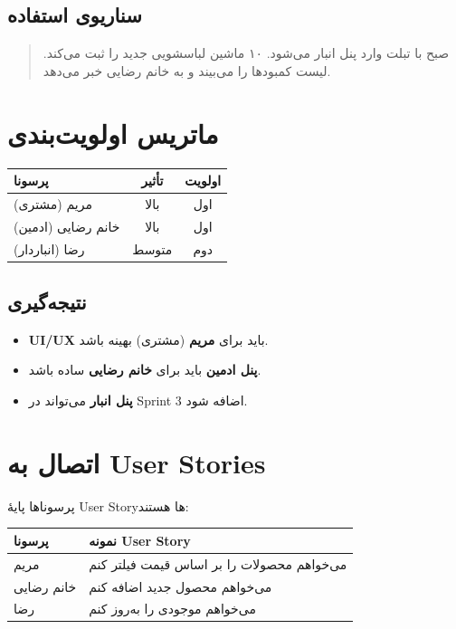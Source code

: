 \documentclass[12pt, a4paper]{article}
\begin{document}
\subsection{سناریوی استفاده}
\begin{quote}
صبح با تبلت وارد پنل انبار می‌شود.
۱۰ ماشین لباسشویی جدید را ثبت می‌کند.
لیست کمبودها را می‌بیند و به خانم رضایی خبر می‌دهد.
\end{quote}

\section{ماتریس اولویت‌بندی}

\begin{center}
\begin{tabular}{|l|c|c|}
\hline
\textbf{پرسونا} & \textbf{تأثیر} & \textbf{اولویت} \\
\hline
مریم (مشتری) & بالا & اول \\
\hline
خانم رضایی (ادمین) & بالا & اول \\
\hline
رضا (انباردار) & متوسط & دوم \\
\hline
\end{tabular}
\end{center}

\subsection{نتیجه‌گیری}
\begin{itemize}
    \item \textbf{UI/UX} باید برای \textbf{مریم} (مشتری) بهینه باشد.
    \item \textbf{پنل ادمین} باید برای \textbf{خانم رضایی} ساده باشد.
    \item \textbf{پنل انبار} می‌تواند در Sprint 3 اضافه شود.
\end{itemize}

\section{اتصال به User Stories}

پرسوناها پایهٔ User Storyها هستند:

\begin{center}
\begin{tabular}{|l|l|}
\hline
\textbf{پرسونا} & \textbf{نمونه User Story} \\
\hline
مریم & می‌خواهم محصولات را بر اساس قیمت فیلتر کنم \\
\hline
خانم رضایی & می‌خواهم محصول جدید اضافه کنم \\
\hline
رضا & می‌خواهم موجودی را به‌روز کنم \\
\hline
\end{tabular}
\end{center}
\end{document}
